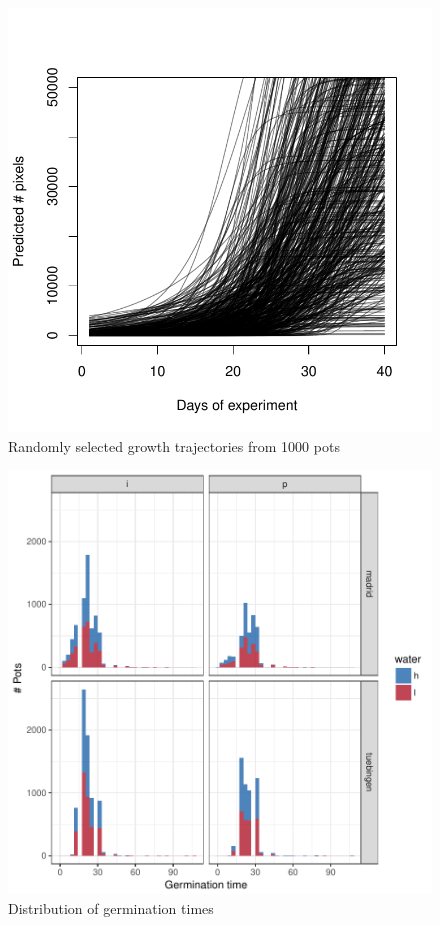 \documentclass[12pt,]{article}
\begin{document}
\begin{figure}
    \centerline{\includegraphics[width=5in]{../figs/Figure_growth_trajectories.pdf}}
    \caption{ Randomly selected growth trajectories from 1000 pots}
    \label{fig:trajectories}
\end{figure}

\begin{figure}
    \centerline{\includegraphics[width=5in]{../figs/Figure_germination_distribution.pdf}}
    \caption{ Distribution of germination times }
    \label{fig:germination}
\end{figure}
\end{document}
